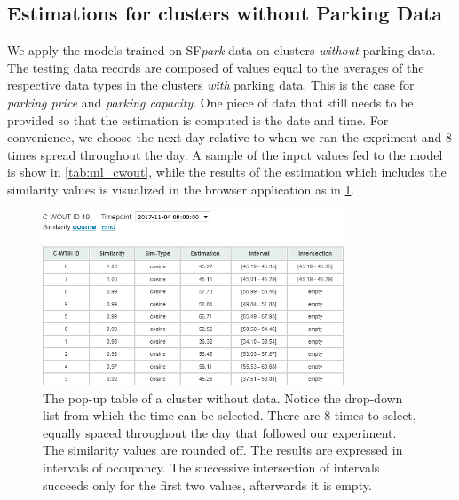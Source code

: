 \documentclass{ws-ijait}
\begin{document}
	\subsection{Estimations for clusters without Parking Data}
	We apply the models trained on SF\textit{park} data on clusters \textit{without} parking data.
	The testing data records are composed of values equal to the averages of the respective data types in the clusters \textit{with} parking data.
	This is the case for \textit{parking price} and \textit{parking capacity}.
	One piece of data that still needs to be provided so that the estimation is computed is the date and time.
	For convenience, we choose the next day relative to when we ran the expriment and 8 times spread throughout the day.
	A sample of the input values fed to the model is show in \cref{tab:ml_cwout}, while the results of the estimation which includes the similarity values is visualized in the browser application as in \cref{fig:cwout_table}.
	
	\begin{figure}[!ht]
		\centering
		\includegraphics[width=0.8\textwidth]{../graphics/cwout_cosine_table.png}
		\caption{The pop-up table of a cluster without data.
			Notice the drop-down list from which the time can be selected. There are 8 times to select, equally spaced throughout the day that followed our experiment. The similarity values are rounded off. The results are expressed in intervals of occupancy. The successive intersection of intervals succeeds only for the first two values, afterwards it is empty.}
		\label{fig:cwout_table}
	\end{figure}
	
\end{document}
